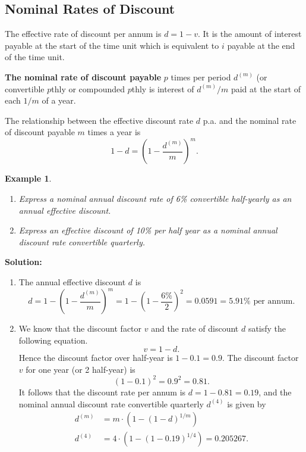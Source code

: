 \documentclass[
]{book}
\theoremstyle{definition}
\theoremstyle{definition}
\newtheorem{example}{Example}[chapter]
\theoremstyle{definition}
\theoremstyle{definition}
\theoremstyle{remark}
\begin{document}
\subsection{Nominal Rates of Discount}\label{nominal-rates-of-discount}

The effective rate of discount per annum is \(d = 1 -v\). It is the amount
of interest payable at the start of the time unit which is equivalent to
\(i\) payable at the end of the time unit.

\textbf{The nominal rate of discount payable} \(p\) times per period \(d^{(m)}\)
(or convertible \(p\)thly or compounded \(p\)thly is interest of \(d^{(m)}/m\)
paid at the start of each \(1/m\) of a year.

The relationship between the effective discount rate \(d\) p.a. and the
nominal rate of discount payable \(m\) times a year is
\[1 - d = \left(1 - \frac{d^{(m)}}{m}\right)^m.\]

\begin{example}
\leavevmode

\begin{enumerate}
\def\labelenumi{\arabic{enumi}.}
\item
  \emph{Express a nominal annual discount rate of 6\% convertible
  half-yearly as an annual effective discount.}
\item
  \emph{Express an effective discount of 10\% per half year as a nominal
  annual discount rate convertible quarterly.}
\end{enumerate}

\end{example}

\textbf{Solution:}

\begin{enumerate}
\def\labelenumi{\arabic{enumi}.}
\item
  The annual effective discount \(d\) is
  \[d = 1-  \left(1 - \frac{d^{(m)}}{m}\right)^m = 1-  \left(1 - \frac{6\%}{2}\right)^2 = 0.0591 = 5.91\% \text{ per annum}.\]
\item
  We know that the discount factor \(v\) and the rate of discount \(d\)
  satisfy the following equation. \[v =  1- d.\] Hence the discount
  factor over half-year is \(1 - 0.1 = 0.9\). The discount factor \(v\)
  for one year (or 2 half-year) is \[(1-0.1)^2 = 0.9^2 = 0.81.\] It
  follows that the discount rate per annum is \(d = 1- 0.81 = 0.19\),
  and the nominal annual discount rate convertible quarterly \(d^{(4)}\)
  is given by \[\begin{aligned}
       d^{(m)} &= m \cdot \left( 1-      (1 - d)^{1/m}  \right) \\
       d^{(4)} &= 4 \cdot \left( 1-      (1 - 0.19)^{1/4}  \right) = 0.205267.
      \end{aligned}\]
\end{enumerate}
\end{document}
